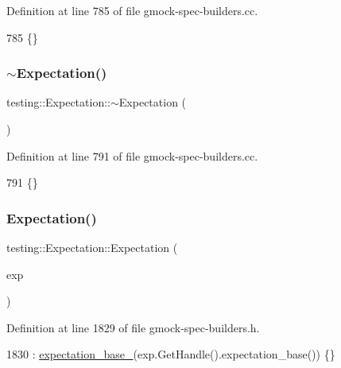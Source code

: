 Definition at line 785 of file gmock-\/spec-\/builders.\+cc.


\begin{DoxyCode}
785 \{\}
\end{DoxyCode}
\mbox{\label{classtesting_1_1Expectation_a7a5c0a19222bb2f1eaff1906f853eed4}} 
\subsubsection{\texorpdfstring{$\sim$\+Expectation()}{~Expectation()}}
{\footnotesize\ttfamily testing\+::\+Expectation\+::$\sim$\+Expectation (\begin{DoxyParamCaption}{ }\end{DoxyParamCaption})}



Definition at line 791 of file gmock-\/spec-\/builders.\+cc.


\begin{DoxyCode}
791 \{\}
\end{DoxyCode}
\mbox{\label{classtesting_1_1Expectation_a58e0c78b0f47365ac058be117fea655c}} 
\subsubsection{\texorpdfstring{Expectation()}{Expectation()}\hspace{0.1cm}{\footnotesize\ttfamily [2/3]}}
{\footnotesize\ttfamily testing\+::\+Expectation\+::\+Expectation (\begin{DoxyParamCaption}\item[{\hyperlink{classtesting_1_1internal_1_1ExpectationBase}{internal\+::\+Expectation\+Base} \&}]{exp }\end{DoxyParamCaption})\hspace{0.3cm}{\ttfamily [inline]}}



Definition at line 1829 of file gmock-\/spec-\/builders.\+h.


\begin{DoxyCode}
1830     : \hyperlink{classtesting_1_1Expectation_a96caf8f40e769b68ea010c098f7190fa}{expectation\_base\_}(exp.GetHandle().expectation\_base()) \{\}
\end{DoxyCode}
\mbox{\label{classtesting_1_1Expectation_a26385861205f24dc78b66d9ba59663b0}} 
